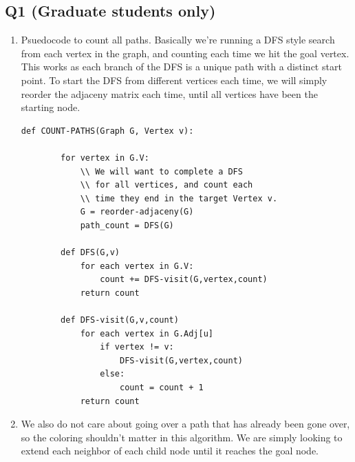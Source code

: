 \documentclass{article}
\begin{document}
\subsection*{Q1 (Graduate students only)}
\begin{enumerate}[label=(\alph*)]
    \item Psuedocode to count all paths. Basically we're running a DFS style search from each vertex in the graph, and counting each time we hit the goal vertex. This works as each branch of the DFS is a unique path with a distinct start point. To start the DFS from different vertices each time, we will simply reorder the adjaceny matrix each time, until all vertices have been the starting node.
    \begin{lstlisting}[frame=single]
        def COUNT-PATHS(Graph G, Vertex v):
        
        for vertex in G.V:
            \\ We will want to complete a DFS
            \\ for all vertices, and count each
            \\ time they end in the target Vertex v.
            G = reorder-adjaceny(G)
            path_count = DFS(G)

        def DFS(G,v)
            for each vertex in G.V:
                count += DFS-visit(G,vertex,count)
            return count
        
        def DFS-visit(G,v,count)
            for each vertex in G.Adj[u]
                if vertex != v:
                    DFS-visit(G,vertex,count)
                else:
                    count = count + 1
            return count
        \end{lstlisting}
        \item We also do not care about going over a path that has already been gone over, so the coloring shouldn't matter in this algorithm. We are simply looking to extend each neighbor of each child node until it reaches the goal node.
\end{enumerate}

\end{document}
